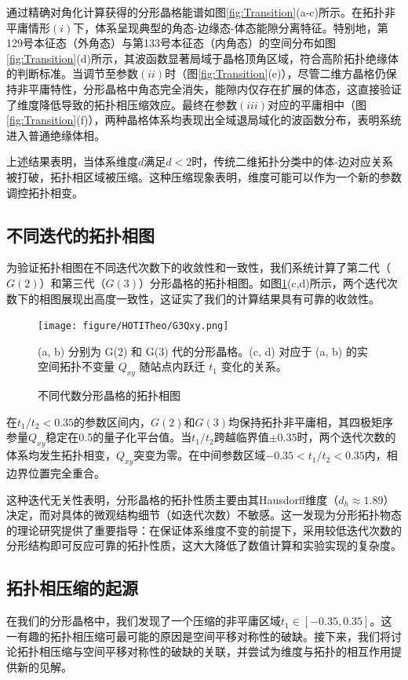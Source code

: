 通过精确对角化计算获得的分形晶格能谱如图\ref{fig:Transition}(a-c)所示。在拓扑非平庸情形$(i)$下，体系呈现典型的角态-边缘态-体态能隙分离特征。特别地，第129号本征态（外角态）与第133号本征态（内角态）的空间分布如图\ref{fig:Transition}(d)所示，其波函数显著局域于晶格顶角区域，符合高阶拓扑绝缘体的判断标准。当调节至参数$(ii)$时（图\ref{fig:Transition}(e)），尽管二维方晶格仍保持非平庸特性，分形晶格中角态完全消失，能隙内仅存在扩展的体态，这直接验证了维度降低导致的拓扑相压缩效应。最终在参数$(iii)$对应的平庸相中（图\ref{fig:Transition}(f)），两种晶格体系均表现出全域退局域化的波函数分布，表明系统进入普通绝缘体相。

上述结果表明，当体系维度$d$满足$d < 2$时，传统二维拓扑分类中的体-边对应关系被打破，拓扑相区域被压缩。这种压缩现象表明，维度可能可以作为一个新的参数调控拓扑相变。

\subsection{不同迭代的拓扑相图}

为验证拓扑相图在不同迭代次数下的收敛性和一致性，我们系统计算了第二代（$G(2)$）和第三代（$G(3)$）分形晶格的拓扑相图。如图\ref{fig:G3Qxy}(c,d)所示，两个迭代次数下的相图展现出高度一致性，这证实了我们的计算结果具有可靠的收敛性。

\begin{figure}[htbp]
    \centering
    \texttt{[image: figure/HOTITheo/G3Qxy.png]}
    \caption{不同代数分形晶格的拓扑相图}(a, b) 分别为 G(2) 和 G(3) 代的分形晶格。(c, d) 对应于 (a, b) 的实空间拓扑不变量 \( Q_{xy} \) 随站点内跃迁 \( t_1 \) 变化的关系。
    \label{fig:G3Qxy}
\end{figure}

在$t_1/t_2 < 0.35$的参数区间内，$G(2)$和$G(3)$均保持拓扑非平庸相，其四极矩序参量$Q_{xy}$稳定在0.5的量子化平台值。当$t_1/t_2$跨越临界值$\pm 0.35$时，两个迭代次数的体系均发生拓扑相变，$Q_{xy}$突变为零。在中间参数区域$-0.35 < t_1/t_2 < 0.35$内，相边界位置完全重合。

这种迭代无关性表明，分形晶格的拓扑性质主要由其Hausdorff维度（$d_h \approx 1.89$）决定，而对具体的微观结构细节（如迭代次数）不敏感。这一发现为分形拓扑物态的理论研究提供了重要指导：在保证体系维度不变的前提下，采用较低迭代次数的分形结构即可反应可靠的拓扑性质，这大大降低了数值计算和实验实现的复杂度。

\subsection{拓扑相压缩的起源}
在我们的分形晶格中，我们发现了一个压缩的非平庸区域$t_1\in[-0.35,0.35]$。这一有趣的拓扑相压缩可最可能的原因是空间平移对称性的破缺。接下来，我们将讨论拓扑相压缩与空间平移对称性的破缺的关联，并尝试为维度与拓扑的相互作用提供新的见解。

